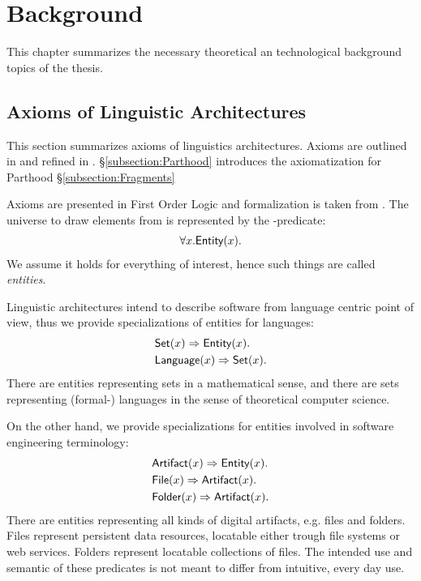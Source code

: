 \chapter{Background}
\label{chapter:Background}
This chapter summarizes the necessary theoretical an technological background topics of the thesis.

\section{Axioms of Linguistic Architectures}
\label{section:AxiomsOfLinguisticArchitectures}
This section summarizes axioms of linguistics architectures.
Axioms are outlined in \cite{DBLP:conf/sle/Lammel16} and refined in \cite{HeinzLV17}.
§\ref{subsection:Parthood} introduces the axiomatization for \gls{Parthood}
§\ref{subsection:Fragments} 

Axioms are presented in First Order Logic and formalization is taken from \cite{HeinzLV17}.
The universe to draw elements from is represented by the \Entity-predicate:
\begin{align*}
\forall x.\textsf{Entity}(x).
\end{align*}
We assume it holds for everything of interest, hence such things are called \textit{entities}.

Linguistic architectures intend to describe software from language centric point of view, thus we provide specializations of entities for languages:
\begin{align*}
&\textsf{Set}(x) \Rightarrow \textsf{Entity}(x).\\
&\textsf{Language}(x) \Rightarrow \textsf{Set}(x).
\end{align*}
There are entities representing sets in a mathematical sense, and there are sets representing (formal-) languages in the sense of theoretical computer science.

On the other hand, we provide specializations for entities involved in software engineering terminology:
\begin{align*}
&\textsf{Artifact}(x) \Rightarrow \textsf{Entity}(x).\\
&\textsf{File}(x) \Rightarrow \textsf{Artifact}(x).\\
&\textsf{Folder}(x) \Rightarrow \textsf{Artifact}(x).
\end{align*}
There are entities representing all kinds of digital artifacts, e.g. files and folders.
Files represent persistent data resources, locatable either trough file systems or web services.
Folders represent locatable collections of files.
The intended use and semantic of these predicates is not meant to differ from intuitive, every day use.


